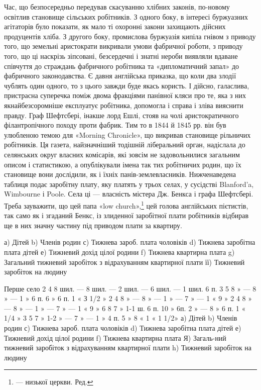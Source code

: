Час, що безпосередньо передував скасуванню хлібних законів,
по-новому освітлив становище сільських робітників. З одного
боку, в інтересі буржуазних агітаторів було показати, як
мало ті охоронні закони захищають дійсних продуцентів хліба.
З другого боку, промислова буржуазія кипіла гнівом з приводу
того, що земельні аристократи викривали умови фабричної роботи,
з приводу того, що ці наскрізь зіпсовані, безсердечні і
знатні нероби виявляли вдаване співчуття до страждань фабричного
робітника та «дипломатичний запал» до фабричного законодавства.
Є давня англійська приказка, що коли два злодії
чублять один одного, то з цього завжди буде якась користь.
І дійсно, галаслива, пристрасна суперечка поміж двома фракціями
панівної кляси про те, яка з них якнайбезсоромніше експлуатує
робітника, допомогла і справа і зліва вияснити правду. Граф
Шефтсбері, інакше лорд Ешлі, стояв на чолі аристократичного
філантропічного походу проти фабрик. Тим то в 1844 й
1845 рр. він був улюбленою темою для «Morning Chronicle», що
викривав становище рільничих робітників. Ця газета, найзначніший
тодішній ліберальний орган, надіслала до селянських округ
власних комісарів, які зовсім не задовольнилися загальним
описом і статистикою, а опублікували імена так тих робітничих
родин, що їх становище вони дослідили, як і їхніх панів-землевласників.
Нижченаведена таблиця подає заробітну плату,
яку платять у трьох селах, у сусідстві Blanford’a, Wimbourne
і Poole. Села ці — власність містера Дж. Бенкса і графа Шефтсбері.
Треба зауважити, що цей папа «low church»,\footnote*{
— низької церкви. Ред.
} цей голова англійських
пієтистів, так само як і згаданий Бенкс, із злиденної
заробітної плати робітників відбирав ще в них значну частину
під приводом плати за квартиру.

а) Дітей    b) Членів родин    с) Тижнева зароб. плата чоловіків    d) Тижнева заробітна плата дітей
   е) Тижневий дохід цілої родини    f) Тижнева квартирна плата
g) Загальний тижневий заробіток з відрахуванням квартирної плати    її) Тижневий заробіток на людину

Перше село
2    4    8 шил. —                8 шил. —     2 шил. —       6 шил.   —     1 шил. 6      п.
3    5    8    »     —                 8   »      —     1    »      6 п.   6    »       6 п.  1   «
    З 1/2 »
2    4    8    »     —                 8   »      —     1    »      —      7    »       —      1   «
     9       »
2    4    8    »     —                 8   »      —     1    »      —      7    »       —      1   «
     9       »
6    8    7    »    1-1 ш. 6 п.  10 »      6п.   2    »     —       8    »       6 п.   1  «
1/4 »
3    5    7    »    1-2  » —       7   »      —     1    »      4 п.   5    »       8 «     1  «
 1 1/2»
а) Дітей  b) Членів родин    с) Тижнева зароб. плата чоловіків    d) Тижнева заробітна плата дітей
 е) Тижневий дохід цілої родини    f) Тижнева квартирна плата    Я) Загаль-ний тижневий заробіток з
відрахуванням квартирної плати    h) Тижневий заробіток на людину

